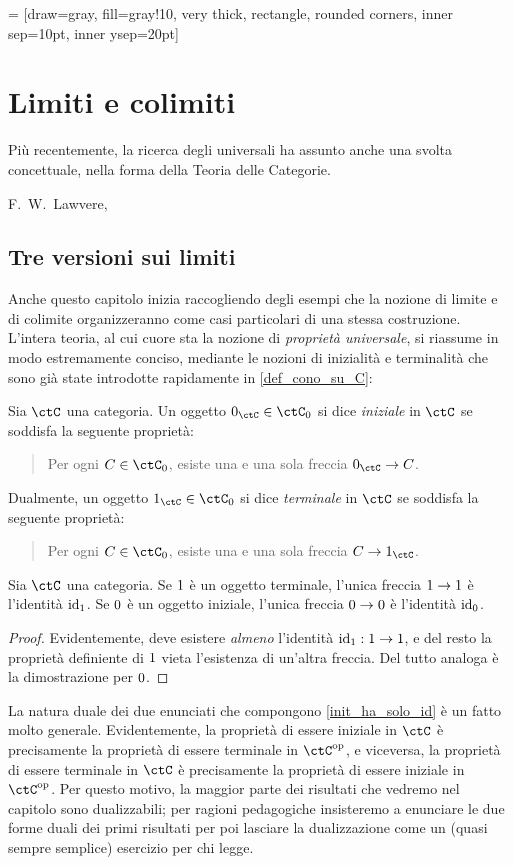  = [draw=gray, fill=gray!10, very thick,
rectangle, rounded corners, inner sep=10pt, inner ysep=20pt]
\chapter{Limiti e colimiti}\label{chap_limiti_colimiti}
\epigraph{Più recentemente, la ricerca degli universali ha assunto anche una svolta concettuale, nella forma della Teoria delle Categorie.}{F.\ W.\ Lawvere, \cite{lawvere1969adjointness}}
\section{Tre versioni sui limiti}
Anche questo capitolo inizia raccogliendo degli esempi che la nozione di limite e di colimite organizzeranno come casi particolari di una stessa costruzione. L'intera teoria, al cui cuore sta la nozione di \emph{proprietà universale}, si riassume in modo estremamente conciso, mediante le nozioni di inizialità e terminalità che sono già state introdotte rapidamente in \ref{def_cono_su_C}:
\begin{definition}
	Sia \(\ctC\) una categoria. Un oggetto \(\init_\ctC\in\ctC_0\) si dice \emph{iniziale} in \(\ctC\) se soddisfa la seguente proprietà:
	\begin{quote}
		Per ogni \(C\in\ctC_0\), esiste una e una sola freccia \(\init_\ctC \to C\).
	\end{quote}
	Dualmente, un oggetto \(\term_\ctC\in\ctC_0\) si dice \emph{terminale} in \(\ctC\) se soddisfa la seguente proprietà:
	\begin{quote}
		Per ogni \(C\in\ctC_0\), esiste una e una sola freccia \(C\to\term_\ctC\).
	\end{quote}
\end{definition}
\begin{lemma}\label{init_ha_solo_id}
	Sia \(\ctC\) una categoria. Se \(1\) è un oggetto terminale, l'unica freccia \(1\to1\) è l'identità \(\mathrm{id}_1\). Se \(0\) è un oggetto iniziale, l'unica freccia \(0\to0\) è l'identità \(\mathrm{id}_0\).
\end{lemma}
\begin{proof}
	Evidentemente, deve esistere \emph{almeno} l'identità \(\mathrm{id}_1 : 1\to1\), e del resto la proprietà definiente di \(1\) vieta l'esistenza di un'altra freccia. Del tutto analoga è la dimostrazione per \(0\).
\end{proof}
La natura duale dei due enunciati che compongono \ref{init_ha_solo_id} è un fatto molto generale. Evidentemente, la proprietà di essere iniziale in \(\ctC\) è precisamente la proprietà di essere terminale in \(\ctC^\op\), e viceversa, la proprietà di essere terminale in \(\ctC\) è precisamente la proprietà di essere iniziale in \(\ctC^\op\). Per questo motivo, la maggior parte dei risultati che vedremo nel capitolo sono dualizzabili; per ragioni pedagogiche insisteremo a enunciare le due forme duali dei primi risultati per poi lasciare la dualizzazione come un (quasi sempre semplice) esercizio per chi legge.
